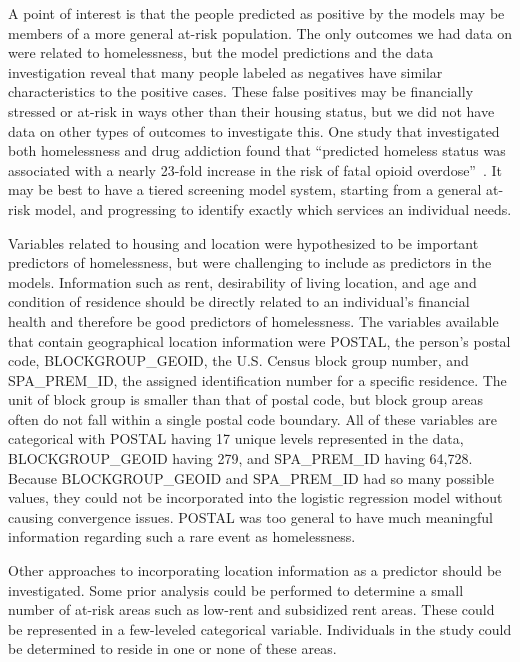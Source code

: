 \documentclass[10pt,letterpaper]{article}
\begin{document}
A point of interest is that the people predicted as positive by the models may be members of a more general at-risk population. The only outcomes we had data on were related to homelessness, but the model predictions and the data investigation reveal that many people labeled as negatives have similar characteristics to the positive cases. These false positives may be financially stressed or at-risk in ways other than their housing status, but we did not have data on other types of outcomes to investigate this. One study that investigated both homelessness and drug addiction found that ``predicted homeless status was associated with a nearly 23-fold increase in the risk of fatal opioid overdose''~\cite{byrne2020classification}. It may be best to have a tiered screening model system, starting from a general at-risk model, and progressing to identify exactly which services an individual needs.

Variables related to housing and location were hypothesized to be important predictors of homelessness, but were challenging to include as predictors in the models. Information such as rent, desirability of living location, and age and condition of residence should be directly related to an individual's financial health and therefore be good predictors of homelessness. The variables available that contain geographical location information were POSTAL, the person's postal code, BLOCKGROUP\_GEOID, the U.S. Census block group number, and SPA\_PREM\_ID, the assigned identification number for a specific residence. The unit of block group is smaller than that of postal code, but block group areas often do not fall within a single postal code boundary. All of these variables are categorical with POSTAL having 17 unique levels represented in the data, BLOCKGROUP\_GEOID having 279, and SPA\_PREM\_ID having 64,728. Because BLOCKGROUP\_GEOID and SPA\_PREM\_ID had so many possible values, they could not be incorporated into the logistic regression model without causing convergence issues. POSTAL was too general to have much meaningful information regarding such a rare event as homelessness. 

Other approaches to incorporating location information as a predictor should be investigated. Some prior analysis could be performed to determine a small number of at-risk areas such as low-rent and subsidized rent areas. These could be represented in a few-leveled categorical variable. Individuals in the study could be determined to reside in one or none of these areas.
\end{document}
